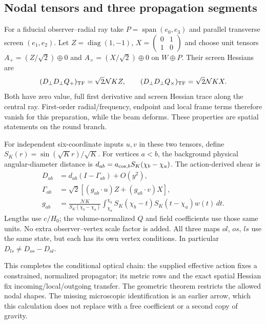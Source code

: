 \documentclass[11pt,a4paper]{article}
\newcommand{\NN}{\mathcal N}\newcommand{\RR}{\mathcal R}
\begin{document}
\subsection{Nodal tensors and three propagation segments}

For a fiducial observer--radial ray take
$P=\operatorname{span}(e_0,e_3)$ and parallel transverse screen
$(e_1,e_2)$. Let $Z=\operatorname{diag}(1,-1)$,
$X=\left(\begin{smallmatrix}0&1\\1&0\end{smallmatrix}\right)$ and
choose unit tensors $A_+=(Z/\sqrt2)\oplus0$ and
$A_\times=(X/\sqrt2)\oplus0$ on $W\oplus P$. Their screen Hessians are
\begin{equation}
 (D_\perp D_\perp Q_+)_{\rm TF}=\sqrt2\NN KZ,\qquad
 (D_\perp D_\perp Q_\times)_{\rm TF}=\sqrt2\NN KX.
 \label{eq:hessians}
\end{equation}
Both have zero value, full first derivative and screen Hessian trace
along the central ray. First-order radial/frequency, endpoint and local
frame terms therefore vanish for this preparation, while the beam
deforms. These properties are spatial statements on the round branch.

For independent six-coordinate inputs $u,v$ in these two tensors, define
$S_K(r)=\sin(\sqrt K r)/\sqrt K$. For vertices $a<b$, the background
physical angular-diameter distance is
$d_{ab}=a_{{\rm cos},b}S_K(\chi_b-\chi_a)$. The action-derived shear is
\begin{align}
 D_{ab}&=d_{ab}(I-\Gamma_{ab})+O(y^2),\nonumber\\
 \Gamma_{ab}&=\sqrt2[(g_{ab}\cdot u)Z+(g_{ab}\cdot v)X],
 \label{eq:gamma}\\
 g_{ab}&=\frac{\NN K}{S_K(\chi_b-\chi_a)}
 \int_{\chi_a}^{\chi_b}S_K(\chi_b-t)S_K(t-\chi_a)w(t)\,dt .
 \label{eq:g}
\end{align}
Lengths use $c/H_0$; the volume-normalized $Q$ and field coefficients
use those same units. No extra observer--vertex scale factor is added.
All three maps $ol$, $os$, $ls$ use the same state, but each has its
own vertex conditions. In particular $D_{ls}\ne D_{os}-D_{ol}$.

This completes the conditional optical chain: the supplied effective
action fixes a constrained, normalized propagator; its metric rows and
the exact spatial Hessian fix incoming/local/outgoing transfer. The
geometric theorem restricts the allowed nodal shapes. The missing
microscopic identification is an earlier arrow, which this calculation
does not replace with a free coefficient or a second copy of gravity.
\end{document}
